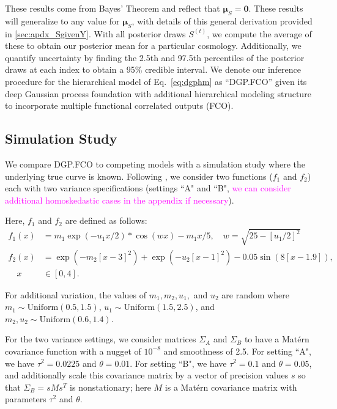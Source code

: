 \documentclass[11pt]{article}
\begin{document}
These results come from Bayes' Theorem and reflect that $\boldsymbol{\mu}_S=\boldsymbol{0}$. 
These results will generalize to any value for $\boldsymbol{\mu}_S$, with details of this 
general derivation provided in \ref{sec:apdx_SgivenY}. With all posterior draws $S^{(t)}$, we compute
the average of these to obtain our posterior mean for a particular cosmology. Additionally,
we quantify uncertainty by finding the 2.5th and 97.5th percentiles of the posterior 
draws at each index to obtain a 95\% credible interval.
We denote our inference procedure for the hierarchical model of Eq.~\ref{eq:dgphm} as
``DGP.FCO'' given its deep Gaussian process foundation with additional hierarchical modeling
structure to incorporate multiple functional correlated outputs (FCO).

\subsection{Simulation Study}
\label{subsec:sim}

We compare DGP.FCO to competing models with a simulation study where the underlying 
true curve is known. Following \cite{moran2024dpc}, we consider two functions 
($f_1$ and $f_2$) each with two variance specifications (settings ``A" and ``B", 
\textcolor{magenta}{we can consider additional homoskedastic cases in the appendix if necessary}). 

Here, $f_1$ and $f_2$ are defined as follows:
\begin{align}
  f_1(x) &= m_1 \exp(-u_1x/2) * \cos(wx) - m_1x/5, \quad w=\sqrt{25-[u_1/2]^2} \\
  f_2(x) &= \exp(-m_2[x-3]^2)+\exp(-u_2[x-1]^2)-0.05\sin(8[x-1.9]), \\ 
  \quad x &\in [0,4].
\end{align}

For additional variation, the values of $m_1, m_2, u_1,$ and $u_2$ are random where 
$m_1 \sim \text{Uniform}(0.5,1.5)$, $u_1 \sim \text{Uniform}(1.5,2.5)$, and $m_2,u_2 
\sim \text{Uniform}(0.6,1.4)$. 
      
For the two variance settings, we consider matrices $\Sigma_A$ and $\Sigma_B$ to 
have a Mat\'ern covariance function with a nugget of $10^{-8}$ and smoothness of 2.5. 
For setting ``A", we have $\tau^2=0.0225$ and $\theta=0.01$. For setting ``B", we have 
$\tau^2=0.1$ and $\theta=0.05$, and additionally scale this covariance matrix by 
a vector of precision values $s$ so that $\Sigma_B = s M s^T$ is nonstationary; here $M$ is 
a Mat\'ern covariance matrix with parameters $\tau^2$ and $\theta$.
\end{document}
